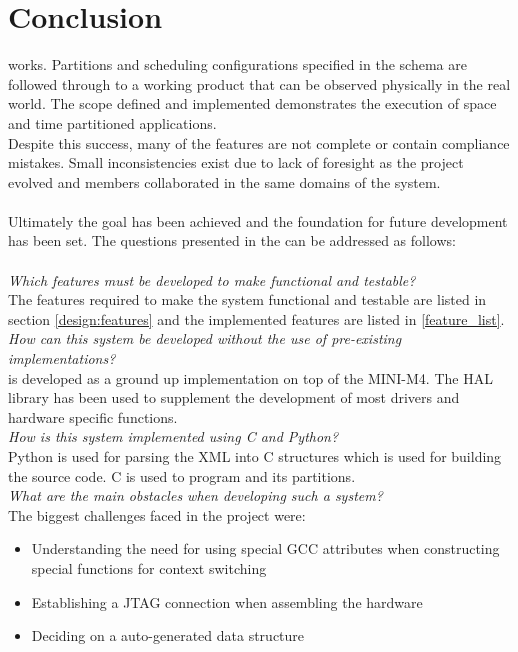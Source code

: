 \chapter{Conclusion}

\OSname{} works. 
Partitions and scheduling configurations specified 
in the schema are followed through to a working 
product that can be observed physically in the real world. 
The scope defined and implemented demonstrates the 
execution of space and time partitioned applications.
\\
Despite this success, many of the features are not 
complete or contain compliance mistakes. 
Small inconsistencies exist due to lack of foresight
as the project evolved and members collaborated 
in the same domains of the system.
\\\\
Ultimately the goal has been achieved and the 
foundation for future development has been set.
The questions presented in the  can be addressed as follows:
\\\\
\textit{Which features must be developed to make \OSname{} functional and
testable?}\\
The features required to make the system functional and testable are listed in  section \ref{design:features}
and the implemented features are listed in \ref{feature_list}.\\

\textit{How can this system be developed without the use of pre-existing
implementations?}\\
\OSname{} is developed as a ground up implementation on top of the MINI-M4.
The HAL library has been used to supplement the development of most drivers and hardware specific functions.\\

\textit{How is this system implemented using C and Python?}\\
Python is used for parsing the XML into C structures which is used for building the source code.
C is used to program \OSname{} and its partitions.\\

\textit{What are the main obstacles when developing such a system?}\\
The biggest challenges faced in the project were:
\begin{itemize}
	\item Understanding the need for using special GCC attributes when constructing special functions for context switching
	\item Establishing a JTAG connection when assembling the hardware
	\item Deciding on a auto-generated data structure
\end{itemize}

